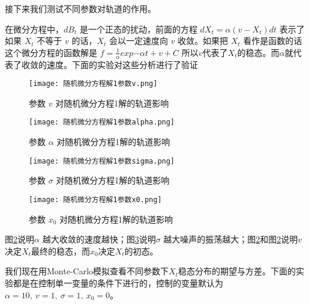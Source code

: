 \documentclass{article}
\begin{document}
接下来我们测试不同参数对轨道的作用。

在微分方程中，$d B_t$ 是一个正态的扰动，前面的方程 $d X_{t}=\alpha\left(v-X_{t}\right) d t$ 表示了如果 $X_t$ 不等于 $v$ 的话，$X_t$ 会以一定速度向 $v$ 收敛。如果把 $X_t$ 看作是函数的话这个微分方程的函数解是 $f = \frac{1}{\alpha} exp{-\alpha t} + v + C$ 所以$v$代表了$X_t$的稳态。而$\alpha$就代表了收敛的速度。下面的实验对这些分析进行了验证


\begin{figure}[H]
    \centering
    \texttt{[image: 随机微分方程解1参数v.png]}
    \caption{参数 $v$ 对随机微分方程1解的轨道影响}
    \label{fig:SDE1_v}
    \end{figure}



\begin{figure}[H]
    \centering
    \texttt{[image: 随机微分方程解1参数alpha.png]}
    \caption{参数 $\alpha$ 对随机微分方程1解的轨道影响}
    \label{fig:SDE1_alpha}
    \end{figure}





\begin{figure}[H]
    \centering
    \texttt{[image: 随机微分方程解1参数sigma.png]}
    \caption{参数 $\sigma$ 对随机微分方程1解的轨道影响}
    \label{fig:SDE1_sigma}
    \end{figure}


\begin{figure}[H]
    \centering
    \texttt{[image: 随机微分方程解1参数x0.png]}
    \caption{参数 $x_0$ 对随机微分方程1解的轨道影响}
    \label{fig:SDE1_x0}
    \end{figure}


图\ref{fig:SDE1_alpha}说明$\alpha$ 越大收敛的速度越快；图\ref{fig:SDE1_sigma}说明$\sigma$ 越大噪声的振荡越大；图\ref{fig:SDE1_alpha}和图\ref{fig:SDE1_alpha}说明$v$ 决定$X_t$最终的稳态，而$x_0$决定$X_t$的初态。

我们现在用Monte-Carlo模拟查看不同参数下$X_t$稳态分布的期望与方差。下面的实验都是在控制单一变量的条件下进行的，控制的变量默认为 $\alpha = 10, \ v=1,\ \sigma=1 , \ x_0 = 0$。
\end{document}
